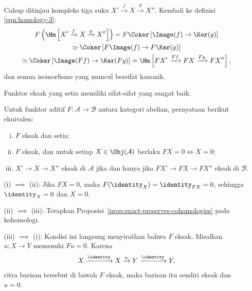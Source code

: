 \begin{bukti}
Cukup ditinjau kompleks tiga suku
$X'\xrightarrow{f}X\xrightarrow{g}X''$. Kembali ke definisi
\eqref{eqn:homology-3}:
\begin{multline*}
	F\left(\Hm\left[X'\xrightarrow{f}X\xrightarrow{g}X''\right]\right)
	=F\Coker\left[\Image(f)\to\Ker(g)\right]\\
	\simeq\Coker\left[F\Image(f)\to F\Ker(g)\right]\\
	\simeq\Coker\left[\Image(Ff)\to\Ker(Fg)\right]
	=\Hm\left[FX'\xrightarrow{Ff}FX\xrightarrow{Fg}FX''\right],
\end{multline*}
dan semua isomorfisme yang muncul bersifat kanonik.
\end{bukti}

Funktor eksak yang setia memiliki sifat-sifat yang sangat baik.

\begin{proposisi}\label{prop:faithful-exact}
Untuk funktor aditif $F:\mathcal{A}\to\mathcal{B}$ antara kategori abelian,
pernyataan berikut ekuivalen:
\begin{enumerate}[(i)]
	\item $F$ eksak dan setia;
	\item $F$ eksak, dan untuk setiap $X\in\Obj(\mathcal{A})$ berlaku
	$FX=0\iff X=0$;
	\item $X'\to X\to X''$ eksak di $\mathcal{A}$ jika dan hanya jika
	$FX'\to FX\to FX''$ eksak di $\mathcal{B}$.
\end{enumerate}
\end{proposisi}

\begin{bukti}
(i) $\implies$ (ii): Jika $FX=0$, maka
$F(\identity_X)=\identity_{FX}=0$, sehingga $\identity_X=0$ dan $X=0$.

(ii) $\implies$ (iii): Terapkan Proposisi~\ref{prop:exact-preserves-cohomologies}
pada kohomologi.

(iii) $\implies$ (i): Kondisi ini langsung menyiratkan bahwa $F$ eksak.
Misalkan $u:X\to Y$ memenuhi $Fu=0$. Karena
\[X\xrightarrow{\identity}X\xrightarrow{u}Y\xrightarrow{\identity}Y,\]
citra barisan tersebut di bawah $F$ eksak, maka barisan itu sendiri eksak dan $u=0$.
\end{bukti}

